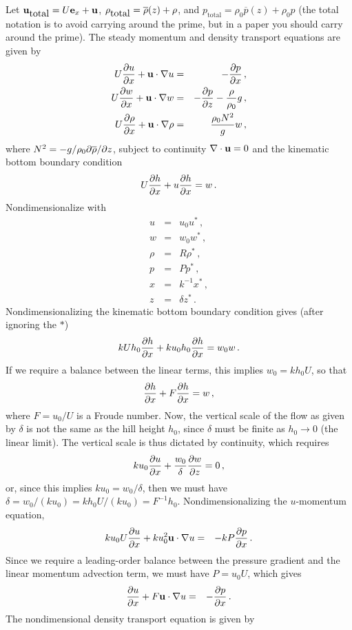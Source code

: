 \documentclass[12pt]{article}
\begin{document}
Let $\mathbf{u}_{\mbox{total}} = U {\bf e}_x + \mathbf{u}$, $\rho_{\mbox{total}} = \overline{\rho}(z) + \rho$, and
$p_{\mbox{total}} = \rho_0 \overline{p}(z) + \rho_0 p$ (the total notation is
to avoid carrying around the prime, but in a paper you should carry around the prime).
The steady momentum and density transport equations are given by
\begin{eqnarray}
U \frac{\partial{u}}{\partial{x}} + \mathbf{u}\cdot\nabla u &=& -\frac{\partial{p}}{\partial{x}}\,,\\
U \frac{\partial{w}}{\partial{x}} + \mathbf{u}\cdot\nabla w &=& -\frac{\partial{p}}{\partial{z}} - \frac{\rho}{\rho_0} g\,,\\
U \frac{\partial{\rho}}{\partial{x}} + \mathbf{u}\cdot\nabla\rho &=& \frac{\rho_0 N^2}{g} w\,,
\end{eqnarray}
where $N^2 = -g/\rho_0 \partial\overline{\rho}/\partial z$, subject to continuity $\nabla\cdot\mathbf{u}=0$ and
the kinematic bottom boundary condition
\[
U\frac{\partial{h}}{\partial{x}} + u \frac{\partial{h}}{\partial{x}} = w\,.
\]  
Nondimensionalize with
\begin{eqnarray*}
u &=& u_0 u^*\,,\\
w &=& w_0 w^*\,,\\
\rho &=& R \rho^*\,,\\
p &=& P p^*\,,\\
x &=& k^{-1} x^*\,,\\
z &=& \delta z^*\,.
\end{eqnarray*}
Nondimensionalizing the kinematic bottom boundary condition gives
(after ignoring the $*$)
\[
k U h_0 \frac{\partial{h}}{\partial{x}} + k u_0 h_0 \frac{\partial{h}}{\partial{x}} = w_0 w\,.
\]
If we require a balance between the linear terms, this implies $w_0 = k h_0 U$, so that
\[
\frac{\partial{h}}{\partial{x}} + F \frac{\partial{h}}{\partial{x}} = w\,,
\]
where $F = u_0/U$ is a Froude number. Now, the vertical scale of the flow as given by $\delta$ is not the
same as the hill height $h_0$, since $\delta$ must be finite as $h_0\to 0$ (the linear limit). The 
vertical scale is thus dictated by continuity, which requires
\[
k u_0 \frac{\partial{u}}{\partial{x}} + \frac{w_0}{\delta} \frac{\partial{w}}{\partial{z}} = 0\,,
\]
or, since this implies $k u_0 = w_0/\delta$, then we must have $\delta = w_0/(k u_0) = k h_0 U/(k u_0) = F^{-1} h_0$.
Nondimensionalizing the $u$-momentum equation,
\begin{eqnarray}
k u_0 U \frac{\partial{u}}{\partial{x}} + k u_0^2\mathbf{u}\cdot\nabla u  &=& -k P \frac{\partial{p}}{\partial{x}}\,.
\end{eqnarray}
Since we require a leading-order balance between the pressure gradient and the linear momentum advection term,
we must have $P = u_0 U$, which gives
\begin{eqnarray}
\frac{\partial{u}}{\partial{x}} + F \mathbf{u}\cdot\nabla u &=& -\frac{\partial{p}}{\partial{x}}\,.
\end{eqnarray}
The nondimensional density transport equation is given by
\end{document}
